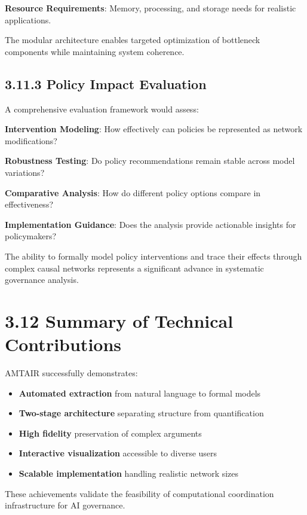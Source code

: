 \documentclass[
  11pt,
  letterpaper,
]{book}
\providecommand{\tightlist}{%
  \setlength{\itemsep}{0pt}\setlength{\parskip}{0pt}}
\begin{document}
\textbf{Resource Requirements}: Memory, processing, and storage needs
for realistic applications.

The modular architecture enables targeted optimization of bottleneck
components while maintaining system coherence.

\subsection{3.11.3 Policy Impact Evaluation}\label{sec-policy-impact}

A comprehensive evaluation framework would assess:

\textbf{Intervention Modeling}: How effectively can policies be
represented as network modifications?

\textbf{Robustness Testing}: Do policy recommendations remain stable
across model variations?

\textbf{Comparative Analysis}: How do different policy options compare
in effectiveness?

\textbf{Implementation Guidance}: Does the analysis provide actionable
insights for policymakers?

The ability to formally model policy interventions and trace their
effects through complex causal networks represents a significant advance
in systematic governance analysis.

\section{3.12 Summary of Technical
Contributions}\label{sec-technical-summary}

AMTAIR successfully demonstrates:

\begin{itemize}
\tightlist
\item
  \textbf{Automated extraction} from natural language to formal models
\item
  \textbf{Two-stage architecture} separating structure from
  quantification
\item
  \textbf{High fidelity} preservation of complex arguments
\item
  \textbf{Interactive visualization} accessible to diverse users
\item
  \textbf{Scalable implementation} handling realistic network sizes
\end{itemize}

These achievements validate the feasibility of computational
coordination infrastructure for AI governance.
\end{document}
